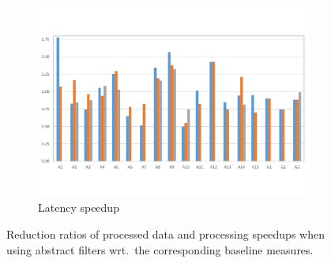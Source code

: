 \begin{figure}
\begin{subfigure}[t]{\columnwidth}
\end{subfigure}
~
\begin{subfigure}[t]{\columnwidth}
\includegraphics[clip, trim=0.8cm 2cm 0.9cm 2cm,
width=\columnwidth]{graphs/latency_red.pdf}
\caption{Latency speedup}
\label{fig:latency_red}
\end{subfigure}

\caption{Reduction ratios of processed data and processing speedups when using
abstract filters wrt.\ the corresponding baseline measures.}
\end{figure}



